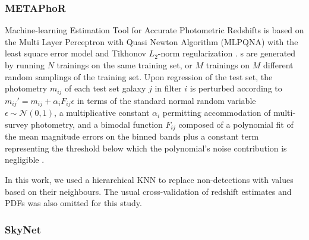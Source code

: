 \subsubsection{METAPhoR}
\label{sec:metaphor}

Machine-learning Estimation Tool for Accurate Photometric Redshifts \citep[\metaphor,][]{Cavuoti:17} is based on the Multi Layer Perceptron with Quasi Newton Algorithm (MLPQNA) with the least square error model and Tikhonov $L_{2}$-norm regularization \citep{Hofmann:18}.
\Pzpdf s are generated by running $N$ trainings on the same training set, or $M$ trainings on $M$ different random samplings of the training set.
Upon regression of the test set, the photometry $m_{ij}$ of each test set galaxy $j$ in filter $i$ is perturbed according to $m_{ij}' = m_{ij} + \alpha_{i} F_{ij} \epsilon$ in terms of the standard normal random variable $\epsilon \sim \mathcal{N}(0, 1)$, a multiplicative constant $\alpha_{i}$ permitting accommodation of multi-survey photometry, and a bimodal function $F_{ij}$ composed of a polynomial fit of the mean magnitude errors on the binned bands plus a constant term representing the threshold below which the polynomial's noise contribution is negligible \citep{Brescia:18}.

In this work, we used a hierarchical KNN to replace non-detections with values based on their neighbours.
The usual cross-validation of redshift estimates and PDFs was also omitted for this study.

\subsubsection{SkyNet}
\label{sec:skynet}

